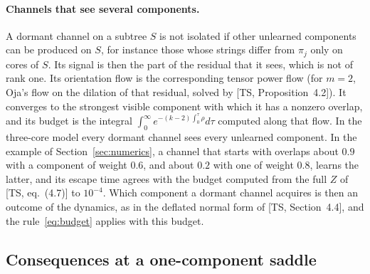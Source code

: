 \documentclass[11pt]{article}
\newcommand{\TS}{\textsf{TS}}
\newcommand{\ts}[1]{[\TS, #1]}
\theoremstyle{definition}
\numberwithin{equation}{section}
\begin{document}
\paragraph{Channels that see several components.} A dormant channel on a subtree $S$ is not isolated if other unlearned components can be produced on $S$, for instance those whose strings differ from $\pi_j$ only on cores of $S$. Its signal is then the part of the residual that it sees, which is not of rank one. Its orientation flow is the corresponding tensor power flow (for $m=2$, Oja's flow on the dilation of that residual, solved by \ts{Proposition~4.2}). It converges to the strongest visible component with which it has a nonzero overlap, and its budget is the integral $\int_0^\infty e^{-(k-2)\int_0^\tau\rho}d\tau$ computed along that flow. In the three-core model every dormant channel sees every unlearned component. In the example of Section~\ref{sec:numerics}, a channel that starts with overlaps about $0.9$ with a component of weight $0.6$, and about $0.2$ with one of weight $0.8$, learns the latter, and its escape time agrees with the budget computed from the full $Z$ of \ts{eq.~(4.7)} to $10^{-4}$. Which component a dormant channel acquires is then an outcome of the dynamics, as in the deflated normal form of \ts{Section~4.4}, and the rule~\eqref{eq:budget} applies with this budget.

\subsection{Consequences at a one-component saddle}
\end{document}
